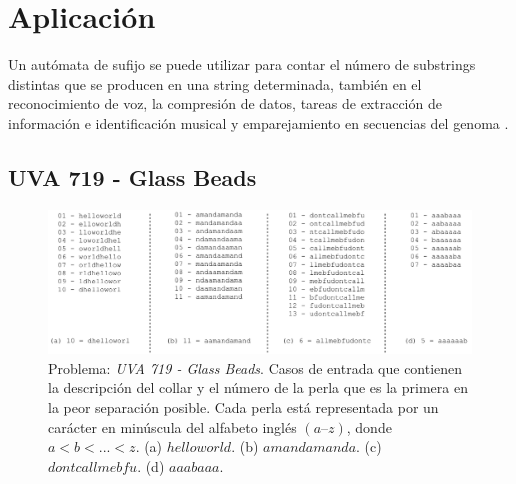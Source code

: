 \section{Aplicación}\label{Application}
Un autómata de sufijo se puede utilizar para contar el número de \glspl{substring} distintas que se producen en una \gls{string} determinada, también en el reconocimiento de voz, la compresión de datos, tareas de extracción de información e identificación musical y emparejamiento en secuencias del genoma \cite{wiki:Suffix_automaton}.

\subsection{UVA 719 - Glass Beads}

\begin{figure}[H]
	\centering
	\includegraphics[width=0.8\linewidth]{doc/Application/img/cases-necklace}
	\caption{Problema: \textit{UVA 719 - Glass Beads}. Casos de entrada que contienen la descripción del collar y el número de la perla que es la primera en la peor separación posible. Cada perla está representada por un carácter en minúscula del alfabeto inglés $(a–z)$, donde $a < b < ... < z$. (a) $helloworld$. (b) $amandamanda$. (c) $dontcallmebfu$. (d) $aaabaaa$. }
	\label{fig:UVA-719-Input-Output}
\end{figure}


\renewcommand{\lstlistingname}{Implementación}%
\renewcommand{\lstlistlistingname}{Lista de \lstlistingname s}%

